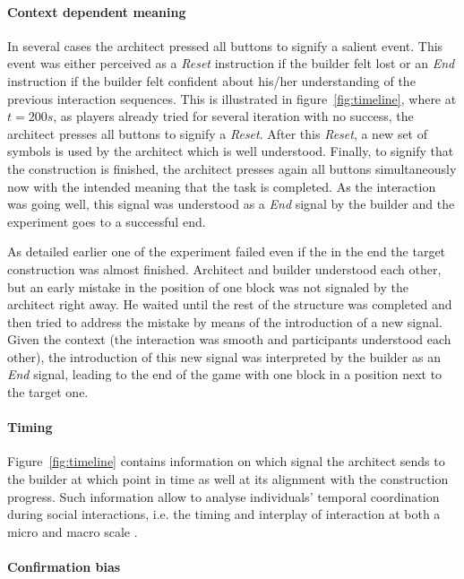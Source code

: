 \paragraph{Context dependent meaning} 

In several cases the architect pressed all buttons to signify a salient event. This event was either perceived as a \emph{Reset} instruction if the builder felt lost or an \emph{End} instruction if the builder felt confident about his/her understanding of the previous interaction sequences. This is illustrated in figure~\ref{fig:timeline}, where at $t=200 s$, as players already tried for several iteration with no success, the architect presses all buttons to signify a \emph{Reset}. After this \emph{Reset}, a new set of symbols is used by the architect which is well understood. Finally, to signify that the construction is finished, the architect presses again all buttons simultaneously now with the intended meaning that the task is completed. As the interaction was going well, this signal was understood as a \emph{End} signal by the builder and the experiment goes to a successful end.

As detailed earlier one of the experiment failed even if the in the end the target construction was almost finished. Architect and builder understood each other, but an early mistake in the position of one block was not signaled by the architect right away. He waited until the rest of the structure was completed and then tried to address the mistake by means of the introduction of a new signal. Given the context (the interaction was smooth and participants understood each other), the introduction of this new signal was interpreted by the builder as an \emph{End} signal, leading to the end of the game with one block in a position next to the target one.

\paragraph{Timing} 

Figure~\ref{fig:timeline} contains information on which signal the architect sends to the builder at which point in time as well at its alignment with the construction progress. Such information allow to analyse individuals' temporal coordination during social interactions, i.e. the timing and interplay of interaction at both a micro and macro scale \cite{delaherche2012interpersonal}.

\paragraph{Confirmation bias} 

